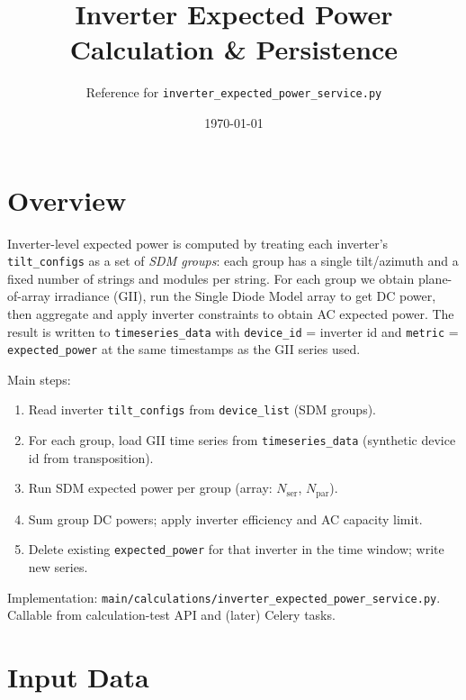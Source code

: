 \documentclass[11pt,a4paper]{article}
\title{Inverter Expected Power\\Calculation \& Persistence}
\author{Reference for \texttt{inverter\_expected\_power\_service.py}}
\date{\today}
\begin{document}
\maketitle
\tableofcontents
\newpage

\section{Overview}

Inverter-level expected power is computed by treating each inverter's \texttt{tilt\_configs} as a set of \emph{SDM groups}: each group has a single tilt/azimuth and a fixed number of strings and modules per string. For each group we obtain plane-of-array irradiance (GII), run the Single Diode Model array to get DC power, then aggregate and apply inverter constraints to obtain AC expected power. The result is written to \texttt{timeseries\_data} with \texttt{device\_id} = inverter id and \texttt{metric} = \texttt{expected\_power} at the same timestamps as the GII series used.

Main steps:
\begin{enumerate}
  \item Read inverter \texttt{tilt\_configs} from \texttt{device\_list} (SDM groups).
  \item For each group, load GII time series from \texttt{timeseries\_data} (synthetic device id from transposition).
  \item Run SDM expected power per group (array: \(N_{\mathrm{ser}}\), \(N_{\mathrm{par}}\)).
  \item Sum group DC powers; apply inverter efficiency and AC capacity limit.
  \item Delete existing \texttt{expected\_power} for that inverter in the time window; write new series.
\end{enumerate}

Implementation: \texttt{main/calculations/inverter\_expected\_power\_service.py}. Callable from calculation-test API and (later) Celery tasks.

\section{Input Data}
\end{document}

